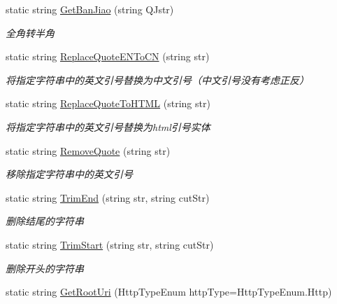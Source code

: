 \begin{DoxyCompactItemize}
static string \hyperlink{class_x_c_l_net_tools_1_1_string_hander_1_1_common_a2951e9d8596697ebd7b2f454d9253d91}{Get\+Ban\+Jiao} (string Q\+Jstr)
\begin{DoxyCompactList}\small\item\em 全角转半角 \end{DoxyCompactList}\item 
static string \hyperlink{class_x_c_l_net_tools_1_1_string_hander_1_1_common_af1c235bbfc59dedcaeb0731301226c3b}{Replace\+Quote\+E\+N\+To\+CN} (string str)
\begin{DoxyCompactList}\small\item\em 将指定字符串中的英文引号替换为中文引号（中文引号没有考虑正反） \end{DoxyCompactList}\item 
static string \hyperlink{class_x_c_l_net_tools_1_1_string_hander_1_1_common_adecc464f722d6bc0e3ab9ba42277d730}{Replace\+Quote\+To\+H\+T\+ML} (string str)
\begin{DoxyCompactList}\small\item\em 将指定字符串中的英文引号替换为html引号实体 \end{DoxyCompactList}\item 
static string \hyperlink{class_x_c_l_net_tools_1_1_string_hander_1_1_common_a7ac48e68f1f3943c8e8425df41aa52ca}{Remove\+Quote} (string str)
\begin{DoxyCompactList}\small\item\em 移除指定字符串中的英文引号 \end{DoxyCompactList}\item 
static string \hyperlink{class_x_c_l_net_tools_1_1_string_hander_1_1_common_a3ed633ff7c9b12a2d63ebe9eb8fd7dd2}{Trim\+End} (string str, string cut\+Str)
\begin{DoxyCompactList}\small\item\em 删除结尾的字符串 \end{DoxyCompactList}\item 
static string \hyperlink{class_x_c_l_net_tools_1_1_string_hander_1_1_common_afcc9efd028a6a7937e8f75307e78b54c}{Trim\+Start} (string str, string cut\+Str)
\begin{DoxyCompactList}\small\item\em 删除开头的字符串 \end{DoxyCompactList}\item 
static string \hyperlink{class_x_c_l_net_tools_1_1_string_hander_1_1_common_adf48c9e4104f2f6900e1e22c68fea365}{Get\+Root\+Uri} (Http\+Type\+Enum http\+Type=Http\+Type\+Enum.\+Http)

\end{DoxyCompactItemize}
